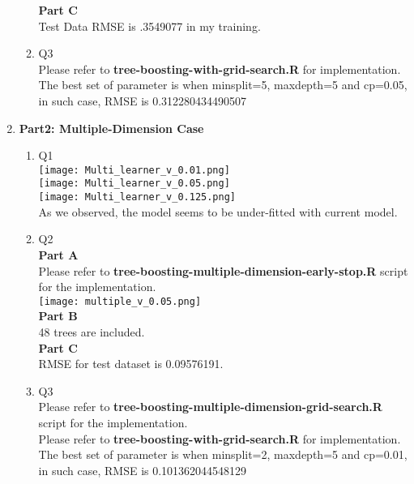 \documentclass{article}
\begin{document}
\begin{enumerate}
\begin{enumerate}
\textbf{Part C} \\
Test Data RMSE is .3549077 in my training.  \\

\item Q3 \\
Please refer to \textbf{tree-boosting-with-grid-search.R} for implementation. The best set of parameter is when minsplit=5, maxdepth=5 and cp=0.05, in such case, RMSE is 0.312280434490507 \\
\end{enumerate}
\item \textbf{Part2: Multiple-Dimension Case}
\begin{enumerate}
\item Q1 \\
\texttt{[image: Multi\_learner\_v\_0.01.png]}\\
\texttt{[image: Multi\_learner\_v\_0.05.png]}\\
\texttt{[image: Multi\_learner\_v\_0.125.png]}\\
As we observed, the model seems to be under-fitted with current model.

\item Q2 \\
\textbf{Part A} \\
Please refer to \textbf{tree-boosting-multiple-dimension-early-stop.R} script for the implementation. \\
\texttt{[image: multiple\_v\_0.05.png]}\\

\textbf{Part B} \\
48 trees are included. \\

\textbf{Part C} \\
RMSE for test dataset is 0.09576191. \\

\item Q3 \\
Please refer to \textbf{tree-boosting-multiple-dimension-grid-search.R} script for the implementation. \\

Please refer to \textbf{tree-boosting-with-grid-search.R} for implementation. The best set of parameter is when minsplit=2, maxdepth=5 and cp=0.01, in such case, RMSE is 0.101362044548129\\

\end{enumerate}
\end{enumerate}
\end{document}
